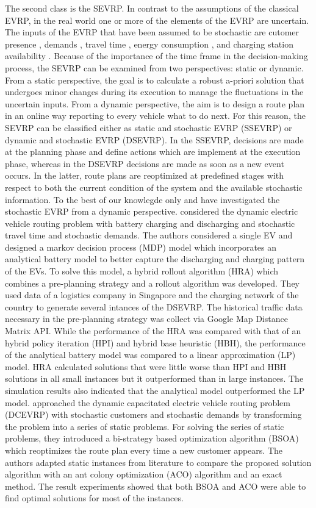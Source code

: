 \documentclass[11pt]{article}
\begin{document}
The second class is the SEVRP. In contrast to the assumptions of the classical EVRP, in the real world one or more of the elements of the EVRP are uncertain. The inputs of the EVRP that have been assumed to be stochastic are cutomer presence \citep{Shi2019}, demands \citep{Lu2019}, travel time \citep{Shao2017}, energy consumption \citep{Pelletier2019}, and charging station availability \citep{Sweda2017}. Because of the importance of the time frame in the decision-making process, the SEVRP can be examined from two perspectives: static or dynamic. From a static perspective, the goal is to calculate a robust a-priori solution that undergoes minor changes during its execution to manage the fluctuations in the uncertain inputs. From a dynamic perspective, the aim is to design a route plan in an online way reporting to every vehicle what to do next. For this reason, the SEVRP can be classified either as static and stochastic EVRP (SSEVRP) or dynamic and stochastic EVRP (DSEVRP). In the SSEVRP, decisions are made at the planning phase and define actions which are implement at the execution phase, whereas in the  DSEVRP decisions are made as soon as a new event occurs. In the latter, route plans are reoptimized at predefined stages with respect to both the current condition of the system and the available stochastic information. To the best of our knowlegde only \cite{Bi2019} and \cite{Lu2019} have investigated the stochastic EVRP from a dynamic perspective. \cite{Bi2019} considered the dynamic electric vehicle routing problem with battery charging and discharging and stochastic travel time and stochastic demands. The authors considered a single EV and designed a markov decision process (MDP) model which incorporates an analytical battery model to better capture the discharging and charging pattern of the EVs. To solve this model, a hybrid rollout algorithm (HRA) which combines a pre-planning strategy and a rollout algorithm was developed. They used data of a logistics company in Singapore and the charging network of the country to generate several intances of the DSEVRP. The historical traffic data necessary in the   pre-planning strategy was collect via Google Map Distance Matrix API. While the performance of the HRA was compared with that of an hybrid policy iteration (HPI) and hybrid base heuristic (HBH), the performance of the analytical battery model was compared to a linear approximation (LP) model. HRA calculated solutions that were little worse than HPI and HBH solutions in all small instances but it outperformed than in large instances. The simulation results also indicated that the analytical model outperformed the LP model. \cite{Lu2019} approached the dynamic capacitated electric vehicle routing problem (DCEVRP) with stochastic customers and stochastic demands by transforming the problem into a series of static problems. For solving the series of static problems, they introduced a bi-strategy based optimization algorithm (BSOA) which reoptimizes the route plan every time a new customer appears. The authors adapted static instances from literature to compare the proposed solution algorithm with an ant colony optimization (ACO) algorithm and an exact method. The result experiments showed that both BSOA and ACO were able to find optimal solutions for most of the instances. 
\end{document}
